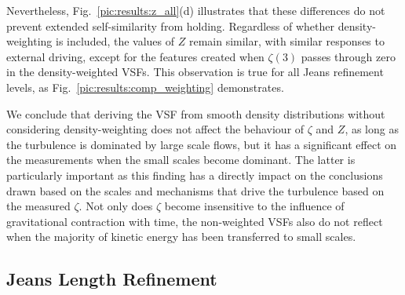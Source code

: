 Nevertheless, Fig.~\ref{pic:results:z_all}(d) illustrates that these differences 
    do not prevent extended self-similarity from holding. Regardless of whether
    density-weighting is included, the values of $Z$ remain similar, with similar
    responses to external driving, except for 
the features created when $\zeta(3)$ 
   passes through zero
in the density-weighted VSFs.
This observation is true for all Jeans refinement levels, as Fig.~\ref{pic:results:comp_weighting} demonstrates.

We conclude that deriving the VSF from smooth density distributions without considering density-weighting does not affect the behaviour of $\zeta$ and $Z$, as long as the turbulence is dominated by large scale 
    flows, but 
it has a significant effect on the measurements when the small scales become dominant.
The latter is particularly important as this finding has a directly impact on the conclusions drawn based on the scales and mechanisms that drive the turbulence based on the measured $\zeta$.
Not only does $\zeta$ become insensitive to the influence of gravitational contraction with time, the non-weighted VSFs also do not reflect when the majority of kinetic energy has been transferred to small scales. 

\subsection{Jeans Length Refinement}\label{discussion:refinement}


